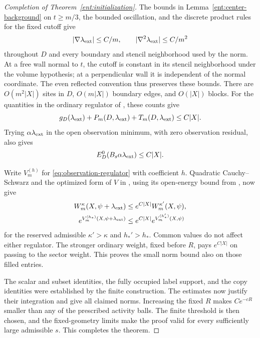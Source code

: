 \begin{proof}[Completion of Theorem~\ref{ent:initialization}]
The bounds in Lemma~\ref{ent:center-background} on \(t\ge m/3\),
the bounded oscillation, and the discrete product rules for the fixed
cutoff give
\[
       |\nabla\lambda_{\rm ext}|\le C/m,\qquad
       |\nabla^2\lambda_{\rm ext}|\le C/m^2
\]
throughout \(D\) and every boundary and stencil neighborhood used by
the norm.  At a free wall normal to \(t\), the cutoff is constant in
its stencil neighborhood under the volume hypothesis; at a perpendicular
wall it is independent of the normal coordinate.  The even reflected
convention thus preserves these bounds.  There are \(O(m^2|X|)\)
sites in \(D\), \(O(m|X|)\) boundary edges, and \(O(|X|)\) blocks.
For the quantities in the ordinary regulator of \cite[Equation~(4.10)]{B},
these counts give
\[
 g_D(\lambda_{\rm ext})+P_m(D,\lambda_{\rm ext})
       +T_m(D,\lambda_{\rm ext})\le C|X|.
\]
Trying \(\alpha\lambda_{\rm ext}\) in the open observation minimum,
with zero observation residual, also gives
\[
                  E_D^0(B_s\alpha\lambda_{\rm ext})\le C|X|.
\]

Write \(V_m^{(h)}\) for \eqref{eq:observation-regulator} with coefficient
\(h\).  Quadratic Cauchy--Schwarz and the optimized form of \(V\) in
\cite[Equation~(9.16)]{B}, using its open-energy bound from
\cite[Lemma~9.2]{B}, now give
\[
\begin{split}
 W_m^\kappa(X,\psi+\lambda_{\rm ext})
       &\le e^{C|X|}W_m^{\kappa'}(X,\psi),\\
 e^{V_m^{(h_*)}(X,\psi+\lambda_{\rm ext})}
       &\le e^{C|X|}e^{V_m^{(h_*')}(X,\psi)}
\end{split}
\]
for the reserved admissible \(\kappa'>\kappa\) and \(h_*'>h_*\).
Common values do not affect either regulator.  The stronger ordinary weight, fixed before
\(R\), pays \(e^{C|X|}\) on passing to the sector
weight.  This proves the small norm bound also on
those filled entries.

The scalar and subset identities, the fully occupied
label support, and the copy identities were established
by the finite construction.  The estimates now justify
their integration and give all claimed norms.  Increasing
the fixed \(R\) makes \(Ce^{-cR}\) smaller than any
of the prescribed activity balls.  The finite threshold
is then chosen, and the fixed-geometry limits make
the proof valid for every sufficiently large admissible
\(s\).  This completes the theorem.
\end{proof}
